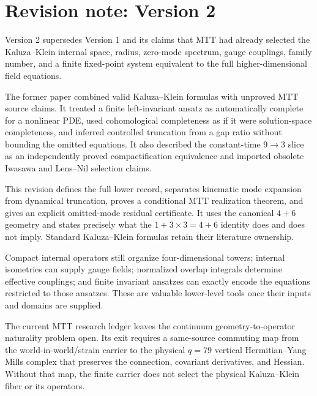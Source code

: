 \documentclass[11pt]{article}
\theoremstyle{definition}
\theoremstyle{remark}
\let\MTToriginalitem\item
\renewcommand{\item}{\par\MTToriginalitem}
\begin{document}
\section*{Revision note: Version 2}
\begin{description}[leftmargin=2.5cm,style=nextline]
\item[Supersedes]
Version 2 supersedes Version 1 and its claims that MTT had already selected
the Kaluza--Klein internal space, radius, zero-mode spectrum, gauge
couplings, family number, and a finite fixed-point system equivalent to the
full higher-dimensional field equations.

\item[Reason]
The former paper combined valid Kaluza--Klein formulas with unproved MTT
source claims.  It treated a finite left-invariant ansatz as automatically
complete for a nonlinear PDE, used cohomological completeness as if it were
solution-space completeness, and inferred controlled truncation from a gap
ratio without bounding the omitted equations.  It also described the
constant-time \(9\to3\) slice as an independently proved compactification
equivalence and imported obsolete Iwasawa and Lens--Nil selection claims.

\item[Resolution]
This revision defines the full lower record, separates kinematic mode
expansion from dynamical truncation, proves a conditional MTT realization
theorem, and gives an explicit omitted-mode residual certificate.  It uses
the canonical \(4+6\) geometry and states precisely what the
\(1+3\times3=4+6\) identity does and does not imply.  Standard
Kaluza--Klein formulas retain their literature ownership.

\item[Retained content]
Compact internal operators still organize four-dimensional towers; internal
isometries can supply gauge fields; normalized overlap integrals determine
effective couplings; and finite invariant ansatzes can exactly encode the
equations restricted to those ansatzes.  These are valuable lower-level
tools once their inputs and domains are supplied.

\item[Remaining boundary]
The current MTT research ledger leaves the continuum
geometry-to-operator naturality problem open.  Its exit requires a
same-source commuting map from the world-in-world/strain carrier to the
physical \(q=79\) vertical Hermitian--Yang--Mills complex that preserves the
connection, covariant derivatives, and Hessian.  Without that map, the
finite carrier does not select the physical Kaluza--Klein fiber or its
operators.
\end{description}
\end{document}
